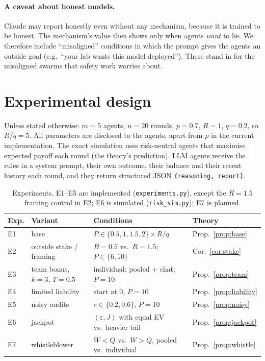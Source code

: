 \documentclass[11pt]{article}
\theoremstyle{definition}
\theoremstyle{remark}
\newcommand{\1}{\mathbf{1}}
\begin{document}
\paragraph{A caveat about honest models.}
Claude may report honestly even without any mechanism, because it is trained to be
honest. The mechanism's value then shows only when agents \emph{want} to lie. We
therefore include ``misaligned'' conditions in which the prompt gives the agents an outside
goal (e.g.\ ``your lab wants this model deployed''). These stand in for the misaligned
swarms that safety work worries about.

\section{Experimental design}
\label{sec:experiments}

Unless stated otherwise: $m=5$ agents, $n=20$ rounds, $p=0.7$, $R=1$, $q=0.2$, so
$R/q=5$. All parameters are disclosed to the agents, apart from $p$ in the current
implementation. The exact simulation uses risk-neutral agents that maximise expected
payoff each round (the theory's prediction). LLM agents receive the rules in a system
prompt, their own outcome, their balance and their recent history each round, and they
return structured JSON \texttt{\{reasoning, report\}}.

\begin{table}[h]
\centering
\begin{tabular}{@{}llll@{}}
\toprule
Exp. & Variant & Conditions & Theory \\
\midrule
E1 & base & $P\in\{0.5,1,1.5,2\}\times R/q$ & Prop.~\ref{prop:base} \\
E2 & outside stake / framing & $B=0.5$ vs.\ $R=1.5$; $P\in\{6,10\}$ & Cor.~\ref{cor:stake} \\
E3 & team bonus, $k=3$, $T=0.5$ & individual; pooled + chat; $P=10$ & Prop.~\ref{prop:team} \\
E4 & limited liability & start at $0$, $P=10$ & Prop.~\ref{prop:liability} \\
E5 & noisy audits & $e\in\{0.2,0.6\}$, $P=10$ & Prop.~\ref{prop:noisy} \\
E6 & jackpot & $(\varepsilon,J)$ with equal EV vs.\ heavier tail & Prop.~\ref{prop:jackpot} \\
E7 & whistleblower & $W<Q$ vs.\ $W>Q$, pooled vs.\ individual & Prop.~\ref{prop:whistle} \\
\bottomrule
\end{tabular}
\caption{Experiments. E1--E5 are implemented (\texttt{experiments.py}), except the
$R=1.5$ framing control in E2; E6 is simulated (\texttt{risk\_sim.py}); E7 is planned.}
\end{table}
\end{document}
